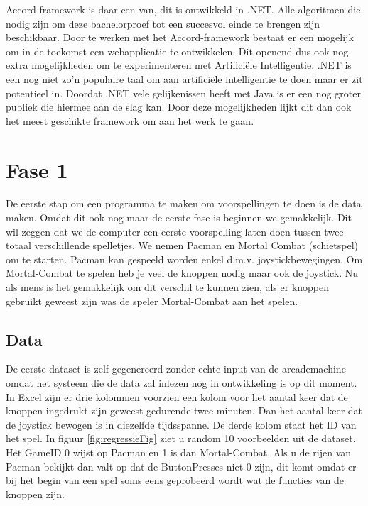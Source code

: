 Accord-framework is daar een van, dit is ontwikkeld in .NET. Alle algoritmen die nodig zijn om deze bachelorproef tot een succesvol einde te brengen zijn beschikbaar. \newline
Door te werken met het Accord-framework bestaat er een mogelijk om in de toekomst een webapplicatie te ontwikkelen. Dit openend dus ook nog extra mogelijkheden om te experimenteren met Artificiële Intelligentie. 
\newline
.NET is een nog niet zo'n populaire taal om aan artificiële intelligentie te doen maar er zit potentieel in. Doordat .NET vele gelijkenissen heeft met Java is er een nog groter publiek die hiermee aan de slag kan.
\newline
Door deze mogelijkheden lijkt dit dan ook het meest geschikte framework om aan het werk te gaan. 

\section{Fase 1}
\label{sec:Fase1}
De eerste stap om een programma te maken om voorspellingen te doen is de data maken. Omdat dit ook nog maar de eerste fase is beginnen we gemakkelijk. Dit wil zeggen dat we de computer een eerste voorspelling laten doen tussen twee totaal verschillende spelletjes. We nemen Pacman en Mortal Combat (schietspel) om te starten. Pacman kan gespeeld worden enkel d.m.v. joystickbewegingen. Om Mortal-Combat te spelen heb je veel de knoppen nodig maar ook de joystick.  Nu als mens is het gemakkelijk om dit verschil te kunnen zien, als er knoppen gebruikt geweest zijn was de speler Mortal-Combat aan het spelen. 

\subsection{Data}
\label{sec:DataFase1}
De eerste dataset is zelf gegenereerd zonder echte input van de arcademachine omdat het systeem die de data zal inlezen nog in ontwikkeling is op dit moment. 
In Excel zijn er drie kolommen voorzien een kolom voor het aantal keer dat de knoppen ingedrukt zijn geweest gedurende twee minuten. Dan het aantal keer dat de joystick bewogen is in diezelfde tijdsspanne. De derde kolom staat het ID van het spel. 
In figuur \ref{fig:regressieFig} ziet u random 10 voorbeelden uit de dataset.
Het GameID 0 wijst op Pacman en 1 is dan Mortal-Combat. Als u de rijen van Pacman bekijkt dan valt op dat de ButtonPresses niet 0 zijn, dit komt omdat er bij het begin van een spel soms eens geprobeerd wordt wat de functies van de knoppen zijn. 

